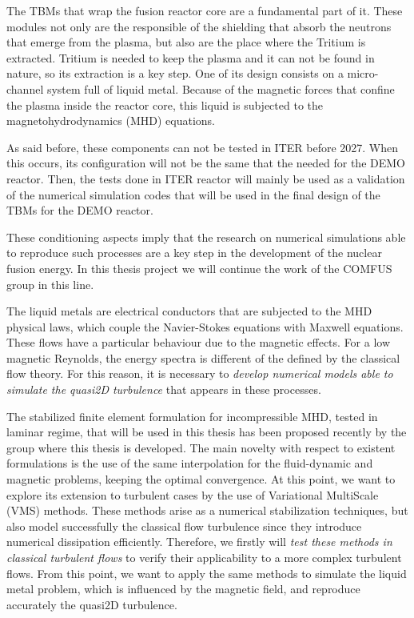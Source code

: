 The TBMs that wrap the fusion reactor core are a fundamental part of it. These modules not only are the responsible of the shielding that absorb the neutrons that emerge from the plasma, but also are the place where the Tritium is extracted. Tritium is needed to keep the plasma and it can not be found in nature, so its extraction is a key step. One of its design consists on a micro-channel system full of  liquid metal. Because of the magnetic forces that confine the plasma inside the reactor core, this liquid is subjected to the magnetohydrodynamics (MHD) equations.

As said before, these components can not be tested in ITER before 2027. When this occurs, its configuration will not be the same that the needed for the DEMO reactor. Then, the tests done in ITER reactor will mainly be used as a validation of the numerical simulation codes that will be used in the final design of the TBMs for the DEMO reactor.

These conditioning aspects imply that the research on numerical simulations able to reproduce such processes are a key step in the development of the nuclear fusion energy. In this thesis project we will continue the work of the COMFUS group in this line.

The liquid metals are electrical conductors that are subjected to the MHD physical laws, which couple the Navier-Stokes equations with Maxwell equations. These flows have a particular behaviour due to the magnetic effects. For a low magnetic Reynolds, the energy spectra is different of the defined by the classical flow theory. For this reason, it is necessary to \emph{develop numerical models able to simulate the quasi2D turbulence} that appears in these processes.

The stabilized finite element formulation for incompressible MHD, tested in laminar regime, that will be used in this thesis has been proposed recently by the group where this thesis is developed. The main novelty with respect to existent formulations is the use of the same interpolation for the fluid-dynamic and magnetic problems, keeping the optimal convergence. At this point, we want to explore its extension to turbulent cases by the use of Variational MultiScale (VMS) methods. These methods arise as a numerical stabilization techniques, but also model successfully the classical flow turbulence since they introduce numerical dissipation efficiently. Therefore, we firstly will \emph{test these methods in classical turbulent flows} to verify their applicability to a more complex turbulent flows. From this point, we want to apply the same methods to simulate the liquid metal problem, which is influenced by the magnetic field, and reproduce accurately the quasi2D turbulence.

